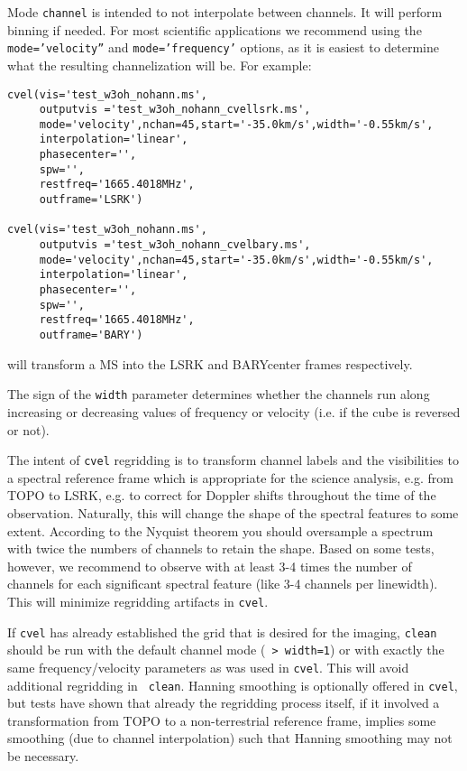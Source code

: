 Mode {\tt channel} is intended to not interpolate between channels. It
will perform binning if needed.  For most scientific applications we
recommend using the {\tt mode='velocity''} and {\tt mode='frequency'}
options, as it is easiest to determine what the resulting
channelization will be. For example: \small
\begin{verbatim}
cvel(vis='test_w3oh_nohann.ms',
     outputvis ='test_w3oh_nohann_cvellsrk.ms',
     mode='velocity',nchan=45,start='-35.0km/s',width='-0.55km/s',
     interpolation='linear',
     phasecenter='',
     spw='',
     restfreq='1665.4018MHz',
     outframe='LSRK')

cvel(vis='test_w3oh_nohann.ms',
     outputvis ='test_w3oh_nohann_cvelbary.ms',
     mode='velocity',nchan=45,start='-35.0km/s',width='-0.55km/s',
     interpolation='linear',
     phasecenter='',
     spw='',
     restfreq='1665.4018MHz',
     outframe='BARY')

\end{verbatim}
\normalsize will transform a MS into the LSRK and BARYcenter frames
respectively.  

The sign of the {\tt width} parameter determines whether the channels
run along increasing or decreasing values of frequency or velocity (i.e.
if the cube is reversed or not). 



The intent of {\tt cvel} regridding is to transform channel labels and
the visibilities to a spectral reference frame which is appropriate
for the science analysis, e.g. from TOPO to LSRK, e.g. to correct for
Doppler shifts throughout the time of the observation. Naturally,
this will change the shape of the spectral features to some
extent. According to the Nyquist theorem you should oversample a
spectrum with twice the numbers of channels to retain the
shape. Based on some tests, however, we recommend to observe with at
least 3-4 times the number of channels for each significant spectral
feature (like 3-4 channels per linewidth). This will minimize
regridding artifacts in {\tt cvel}.  

If {\tt cvel} has already established the grid that is desired for the
imaging, {\tt clean} should be run with the default channel mode ({\tt
  > width=1}) or with exactly the same frequency/velocity parameters
as was used in {\tt cvel}. This will avoid additional regridding in {\tt
  clean}. Hanning smoothing is optionally offered in {\tt cvel}, but
tests have shown that already the regridding process itself, if it
involved a transformation from TOPO to a non-terrestrial reference
frame, implies some smoothing (due to channel interpolation) such that
Hanning smoothing may not be necessary.


